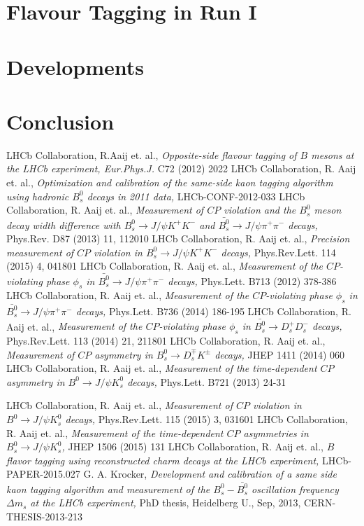 \documentclass{PoS}
\begin{document}
\section{Flavour Tagging in Run I}\label{sec:4}

\section{Developments}\label{sec:5}

\section{Conclusion}\label{sec:6}

\begin{thebibliography}{99}
LHCb Collaboration, R.Aaij et. al., {\it Opposite-side flavour tagging of $B$ mesons at the LHCb experiment, Eur.Phys.J.} C72 (2012) 2022
LHCb Collaboration, R. Aaij et. al., {\it Optimization and calibration of the same-side kaon \mbox{tagging} algorithm using hadronic $B_s^0$ decays in 2011 data,} LHCb-CONF-2012-033
LHCb Collaboration, R. Aaij et. al., {\it Measurement of $C\!P$ violation and the $B_s^0$ meson decay width difference with   $B_s^0\to J\!/\!\psi K^+K^-$ and \mbox{$\bar{B_s^0}\to J\!/\!\psi \pi^+\pi^-$} decays, } Phys.Rev. D87 (2013) 11, 112010
LHCb Collaboration, R. Aaij et. al., {\it Precision measurement of $C\!P$ violation in $B_s^0\to J\!/\!\psi K^+K^-$ decays, } Phys.Rev.Lett. 114 (2015) 4, 041801
 LHCb Collaboration, R. Aaij et. al., {\it Measurement of the $C\!P$-violating phase $\phi_s$ in $\bar{B_s^0}\to J\!/\!\psi \pi^+\pi^-$ decays, } Phys.Lett. B713 (2012) 378-386
 LHCb Collaboration, R. Aaij et. al., {\it Measurement of the $C\!P$-violating phase $\phi_s$ in $\bar{B_s^0}\to J\!/\!\psi \pi^+\pi^-$ decays, } Phys.Lett. B736 (2014) 186-195
 LHCb Collaboration, R. Aaij et. al., {\it Measurement of the $C\!P$-violating phase $\phi_s$ in $\bar{B_s^0}\to D_s^+D_s^-$ decays, } Phys.Rev.Lett. 113 (2014) 21, 211801
 LHCb Collaboration, R. Aaij et. al., {\it Measurement of $C\!P$ asymmetry in \mbox{$B_s^0\to D_s^\mp K^\pm$} decays, } JHEP 1411 (2014) 060
 LHCb Collaboration, R. Aaij et. al., {\it Measurement of the time-dependent $C\!P$ asymmetry in $B^0\to J\!/\!\psi K_s^0$ decays, } Phys.Lett. B721 (2013) 24-31

 LHCb Collaboration, R. Aaij et. al., {\it Measurement of $C\!P$ violation in \mbox{$B^0\to J\!/\!\psi K_s^0$} decays, } Phys.Rev.Lett. 115 (2015) 3, 031601
 LHCb Collaboration, R. Aaij et. al., {\it Measurement of the time-dependent $C\!P$ asymmetries in $B_s^0\to J\!/\!\psi K_s^0$, } JHEP 1506 (2015) 131
 LHCb Collaboration, R. Aaij et. al., {\it $B$ flavor tagging using reconstructed charm decays at the LHCb experiment, } LHCb-PAPER-2015.027
 G. A. Krocker, {\it Development and calibration of a same side kaon tagging algorithm and measurement of the $B_s^0-\bar{B_s^0}$ oscillation frequency $\Delta m_s$ at the LHCb experiment, } PhD thesis, Heidelberg U., Sep, 2013, CERN-THESIS-2013-213

\end{thebibliography} 
\end{document}
